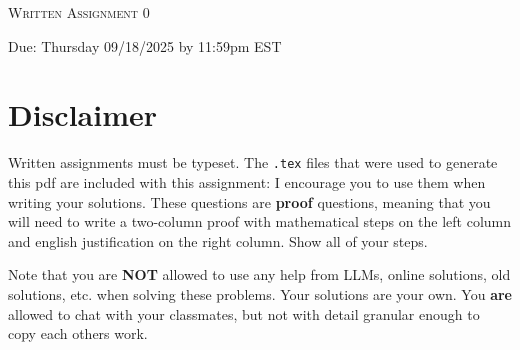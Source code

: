\documentclass[11pt]{article}
\begin{document}
\begin{center}
    {\Large \textsc{Written Assignment 0}}
\end{center}
\begin{center}
    Due: Thursday 09/18/2025 by 11:59pm EST
\end{center}

\section*{\textbf{Disclaimer}}
Written assignments must be typeset. The \texttt{.tex} files that were used to generate this pdf are included with this assignment: I encourage you to use them when writing your solutions. These questions are \textbf{proof} questions, meaning that you will need to write a two-column proof with mathematical steps on the left column and english justification on the right column. Show all of your steps.\newline\newline

\noindent Note that you are \textbf{NOT} allowed to use any help from LLMs, online solutions, old solutions, etc. when solving these problems. Your solutions are your own. You \textbf{are} allowed to chat with your classmates, but not with detail granular enough to copy each others work.
\end{document}
